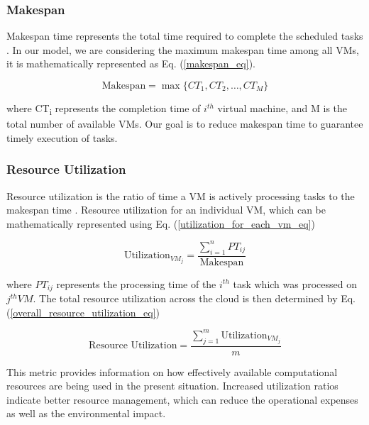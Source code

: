\documentclass[pdflatex,sn-mathphys-num]{sn-jnl}%
\begin{document}
\subsubsection{Makespan}\label{subsubsec3.2.1}
Makespan time represents the total time required to complete the scheduled tasks \cite{GWO}. In our model, we are considering the maximum makespan time among all VMs, it is mathematically represented as Eq. (\ref{makespan_eq}).

\begin{equation} \label{makespan_eq}
\text{Makespan} = \max\{CT_1, CT_2, \dots, CT_M\}
\end{equation}%

where CT\textsubscript{i} represents the completion time of $i^{th}$ virtual machine, and M is the total number of available VMs. Our goal is to reduce makespan time to guarantee timely execution of tasks.

\subsubsection{Resource Utilization}\label{subsubsec3.2.2}
Resource utilization is the ratio of time a VM is actively processing tasks to the makespan time \cite{GWO}. Resource utilization for an individual VM, which can be mathematically represented using Eq. (\ref{utilization_for_each_vm_eq})

\begin{equation} \label{utilization_for_each_vm_eq}
\text{Utilization}_{VM_j} = \frac{\sum_{i=1}^{n} PT_{ij}}{\text{Makespan}}
\end{equation}

where \( PT_{ij} \) represents the processing time of the $i^{th}$ task which was processed on \(j^{th} VM\). The total resource utilization across the cloud is then determined by Eq.(\ref{overall_resource_utilization_eq})

\begin{equation} \label{overall_resource_utilization_eq}
\text{Resource Utilization} = \frac{\sum_{j=1}^{m} \text{Utilization}_{VM_j}}{m}
\end{equation}

This metric provides information on how effectively available computational resources are being used in the present situation. Increased utilization ratios indicate better resource management, which can reduce the operational expenses as well as the environmental impact.
\end{document}
